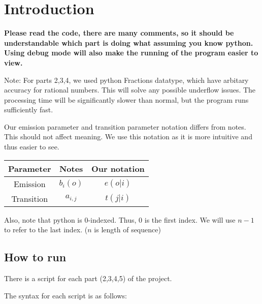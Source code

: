 \documentclass[12pt]{article}
\begin{document}
\maketitle

\section{Introduction}

\textbf{Please read the code, there are many comments, so it should be understandable which part is doing what assuming you know python. Using debug mode will also make the running of the program easier to view.}

Note: For parts 2,3,4, we used python Fractions datatype, which have arbitary accuracy for rational numbers. This will solve any possible underflow issues. The processing time will be significantly slower than normal, but the program runs sufficiently fast.

Our emission parameter and transition parameter notation differs from notes. This should not affect meaning. We use this notation as it is more intuitive and thus easier to see.
\begin{center}
\begin{tabular}{|c|c|c|}
\hline \rule{0pt}{1em}
Parameter  & Notes & Our notation \\
\hline \rule{0pt}{1em}
Emission   & \(b_i(o)\) & \(e(o|i)\) \\
\hline \rule{0pt}{1em}
Transition & \(a_{i,j}\) & \(t(j|i)\) \\
\hline
\end{tabular}
\end{center}

Also, note that python is 0-indexed. Thus, 0 is the first index. We will use \(n-1\) to refer to the last index. (\(n\) is length of sequence)

\subsection{How to run}
There is a script for each part (2,3,4,5) of the project.

The syntax for each script is as follows:
\end{document}
